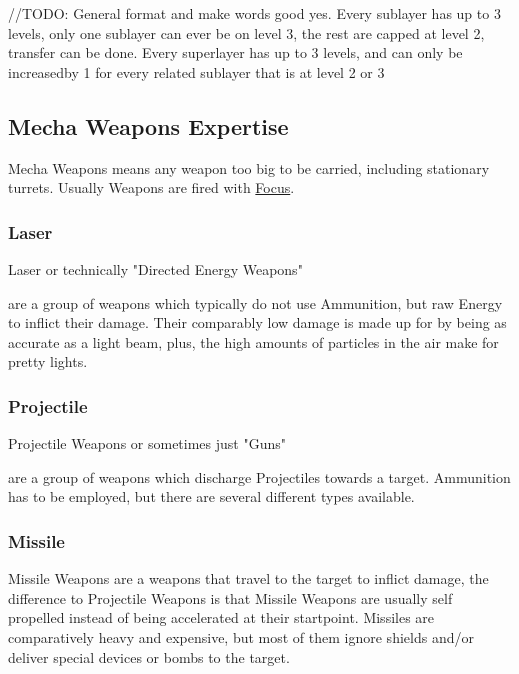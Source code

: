 //TODO: General format and make words good yes.
Every sublayer has up to 3 levels, only one sublayer can ever be on level 3, the rest are capped at level 2,
transfer can be done.
Every superlayer has up to 3 levels, and can only be increasedby 1 for every related sublayer that is at level 2 or 3
\subsection{Mecha Weapons Expertise}\label{subsec:mecha-weapons-expertise}
Mecha Weapons means any weapon too big to be carried, including stationary turrets.
Usually Weapons are fired with \hyperref[itm:focus]{Focus}.
\subsubsection{Laser}
Laser or technically "Directed Energy Weapons" \par
are a group of weapons which typically do not use Ammunition, but raw Energy to inflict their damage.
Their comparably low damage is made up for by being as accurate as a light beam,
plus, the high amounts of particles in the air make for pretty lights.
\subsubsection{Projectile}
Projectile Weapons or sometimes just "Guns" \par
are a group of weapons which discharge Projectiles towards a target.
Ammunition has to be employed, but there are several different types available.
\subsubsection{Missile}
Missile Weapons are a weapons that travel to the target to inflict damage, the difference
to Projectile Weapons is that Missile Weapons are usually self propelled instead of being accelerated at their
startpoint.
Missiles are comparatively heavy and expensive, but most of them ignore shields and/or deliver
special devices or bombs to the target.
